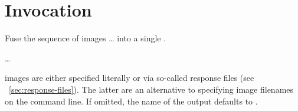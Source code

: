 

\chapter[Invocation]{\label{sec:invocation}%
  Invocation}


\noindent Fuse the sequence of images \dots{} into a single .

\smallskip

\code{\app}  
\dots

\smallskip

%
%
%
%
\noindent {} images are either specified literally or via so-called response files
(see \sectionName~\ref{sec:response-files}).  The latter are an alternative to specifying image
filenames on the command line.  If omitted, the name of the output  defaults to
.









